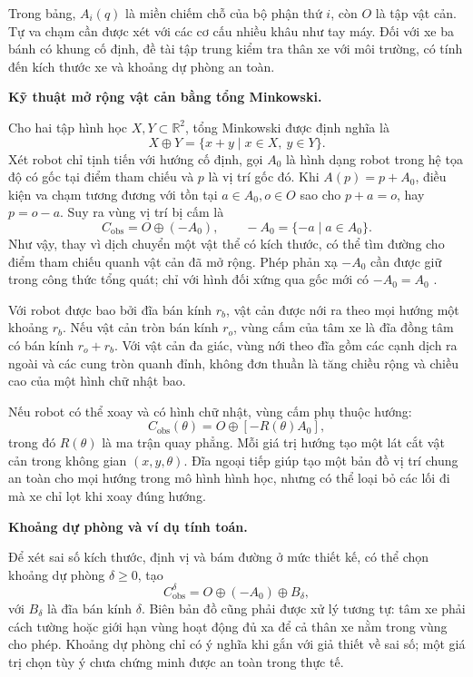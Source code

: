 \documentclass[12pt,a4paper,oneside]{report}
\begin{document}
Trong bảng, \(A_i(q)\) là miền chiếm chỗ của bộ phận thứ \(i\), còn \(O\) là tập vật cản. Tự va chạm cần được xét với các cơ cấu nhiều khâu như tay máy. Đối với xe ba bánh có khung cố định, đề tài tập trung kiểm tra thân xe với môi trường, có tính đến kích thước xe và khoảng dự phòng an toàn.

\noindent\textbf{Kỹ thuật mở rộng vật cản bằng tổng Minkowski.}

Cho hai tập hình học \(X,Y\subset\mathbb{R}^{2}\), tổng Minkowski được định nghĩa là
\[
  X\oplus Y=\{x+y\mid x\in X,\ y\in Y\}.
\]
Xét robot chỉ tịnh tiến với hướng cố định, gọi \(A_0\) là hình dạng robot trong hệ tọa độ có gốc tại điểm tham chiếu và \(p\) là vị trí gốc đó. Khi \(A(p)=p+A_0\), điều kiện va chạm tương đương với tồn tại \(a\in A_0,o\in O\) sao cho \(p+a=o\), hay \(p=o-a\). Suy ra vùng vị trí bị cấm là
\[
  C_{\mathrm{obs}}=O\oplus(-A_0),
  \qquad -A_0=\{-a\mid a\in A_0\}.
\]
Như vậy, thay vì dịch chuyển một vật thể có kích thước, có thể tìm đường cho điểm tham chiếu quanh vật cản đã mở rộng. Phép phản xạ \(-A_0\) cần được giữ trong công thức tổng quát; chỉ với hình đối xứng qua gốc mới có \(-A_0=A_0\) \cite{lavalle-planning-2006}.

Với robot được bao bởi đĩa bán kính \(r_b\), vật cản được nới ra theo mọi hướng một khoảng \(r_b\). Nếu vật cản tròn bán kính \(r_o\), vùng cấm của tâm xe là đĩa đồng tâm có bán kính \(r_o+r_b\). Với vật cản đa giác, vùng nới theo đĩa gồm các cạnh dịch ra ngoài và các cung tròn quanh đỉnh, không đơn thuần là tăng chiều rộng và chiều cao của một hình chữ nhật bao.

Nếu robot có thể xoay và có hình chữ nhật, vùng cấm phụ thuộc hướng:
\[
  C_{\mathrm{obs}}(\theta)=O\oplus[-R(\theta)A_0],
\]
trong đó \(R(\theta)\) là ma trận quay phẳng. Mỗi giá trị hướng tạo một lát cắt vật cản trong không gian \((x,y,\theta)\). Đĩa ngoại tiếp giúp tạo một bản đồ vị trí chung an toàn cho mọi hướng trong mô hình hình học, nhưng có thể loại bỏ các lối đi mà xe chỉ lọt khi xoay đúng hướng.

\noindent\textbf{Khoảng dự phòng và ví dụ tính toán.}

Để xét sai số kích thước, định vị và bám đường ở mức thiết kế, có thể chọn khoảng dự phòng \(\delta\geq0\), tạo
\[
  C_{\mathrm{obs}}^{\delta}
     =O\oplus(-A_0)\oplus B_{\delta},
\]
với \(B_{\delta}\) là đĩa bán kính \(\delta\). Biên bản đồ cũng phải được xử lý tương tự: tâm xe phải cách tường hoặc giới hạn vùng hoạt động đủ xa để cả thân xe nằm trong vùng cho phép. Khoảng dự phòng chỉ có ý nghĩa khi gắn với giả thiết về sai số; một giá trị chọn tùy ý chưa chứng minh được an toàn trong thực tế.
\end{document}
